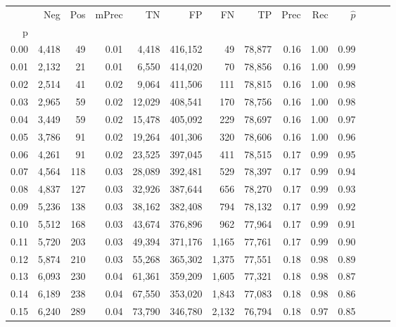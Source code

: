 \begin{tabular}{rrrrrrrrrrrrrr}
\toprule
{} &    Neg &    Pos & mPrec &       TN &       FP &      FN &      TP &  Prec &   Rec & $\hat{p}$ \\
p    &        &        &       &          &          &         &         &       &       &           \\
\midrule
0.00 &  4,418 &     49 &  0.01 &    4,418 &  416,152 &      49 &  78,877 &  0.16 &  1.00 &      0.99 \\
0.01 &  2,132 &     21 &  0.01 &    6,550 &  414,020 &      70 &  78,856 &  0.16 &  1.00 &      0.99 \\
0.02 &  2,514 &     41 &  0.02 &    9,064 &  411,506 &     111 &  78,815 &  0.16 &  1.00 &      0.98 \\
0.03 &  2,965 &     59 &  0.02 &   12,029 &  408,541 &     170 &  78,756 &  0.16 &  1.00 &      0.98 \\
0.04 &  3,449 &     59 &  0.02 &   15,478 &  405,092 &     229 &  78,697 &  0.16 &  1.00 &      0.97 \\
0.05 &  3,786 &     91 &  0.02 &   19,264 &  401,306 &     320 &  78,606 &  0.16 &  1.00 &      0.96 \\
0.06 &  4,261 &     91 &  0.02 &   23,525 &  397,045 &     411 &  78,515 &  0.17 &  0.99 &      0.95 \\
0.07 &  4,564 &    118 &  0.03 &   28,089 &  392,481 &     529 &  78,397 &  0.17 &  0.99 &      0.94 \\
0.08 &  4,837 &    127 &  0.03 &   32,926 &  387,644 &     656 &  78,270 &  0.17 &  0.99 &      0.93 \\
0.09 &  5,236 &    138 &  0.03 &   38,162 &  382,408 &     794 &  78,132 &  0.17 &  0.99 &      0.92 \\
0.10 &  5,512 &    168 &  0.03 &   43,674 &  376,896 &     962 &  77,964 &  0.17 &  0.99 &      0.91 \\
0.11 &  5,720 &    203 &  0.03 &   49,394 &  371,176 &   1,165 &  77,761 &  0.17 &  0.99 &      0.90 \\
0.12 &  5,874 &    210 &  0.03 &   55,268 &  365,302 &   1,375 &  77,551 &  0.18 &  0.98 &      0.89 \\
0.13 &  6,093 &    230 &  0.04 &   61,361 &  359,209 &   1,605 &  77,321 &  0.18 &  0.98 &      0.87 \\
0.14 &  6,189 &    238 &  0.04 &   67,550 &  353,020 &   1,843 &  77,083 &  0.18 &  0.98 &      0.86 \\
0.15 &  6,240 &    289 &  0.04 &   73,790 &  346,780 &   2,132 &  76,794 &  0.18 &  0.97 &      0.85 \\

\end{tabular}
